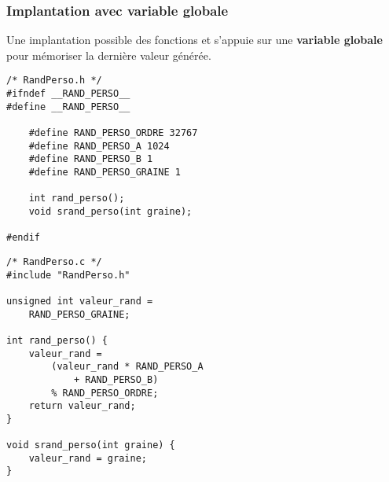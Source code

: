 \begin{frame}[fragile]\frametitle{Implantation avec variable globale}
Une implantation possible des fonctions  et 
s'appuie sur une {\bf variable globale} pour mémoriser la dernière valeur
générée.
\medskip

\begin{center}
\begin{minipage}[c]{.41\textwidth}
\begin{lstlisting}[frame=single,numbers=none,basicstyle=\scriptsize\tt]
/* RandPerso.h */
#ifndef __RAND_PERSO__
#define __RAND_PERSO__

    #define RAND_PERSO_ORDRE 32767
    #define RAND_PERSO_A 1024
    #define RAND_PERSO_B 1
    #define RAND_PERSO_GRAINE 1

    int rand_perso();
    void srand_perso(int graine);

#endif
\end{lstlisting}
\end{minipage}
\quad
\begin{minipage}[c]{.45\textwidth}
\begin{lstlisting}[frame=single,numbers=none,basicstyle=\scriptsize\tt]
/* RandPerso.c */
#include "RandPerso.h"

unsigned int valeur_rand =
    RAND_PERSO_GRAINE;

int rand_perso() {
    valeur_rand =
        (valeur_rand * RAND_PERSO_A
            + RAND_PERSO_B)
        % RAND_PERSO_ORDRE;
    return valeur_rand;
}

void srand_perso(int graine) {
    valeur_rand = graine;
}
\end{lstlisting}
\end{minipage}
\end{center}
\end{frame}

